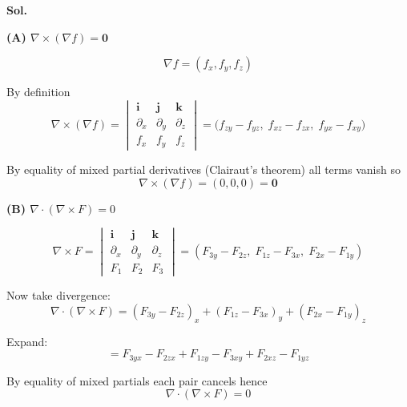 \documentclass[14pt]{extarticle}
\begin{document}
\begin{enumerate}
\textbf{Sol.}

\noindent\textbf{(A) $\nabla\times(\nabla f)=\mathbf{0}$}

\[
\nabla f = (f_x,f_y,f_z)
\]

By definition
\[
\nabla\times(\nabla f)
= \begin{vmatrix}
\mathbf{i} & \mathbf{j} & \mathbf{k} \\
\partial_x & \partial_y & \partial_z \\
f_x & f_y & f_z
\end{vmatrix}
= \bigl(f_{z y}-f_{y z},\; f_{x z}-f_{z x},\; f_{y x}-f_{x y}\bigr)
\]

By equality of mixed partial derivatives (Clairaut's theorem) all terms vanish so
\[
\nabla\times(\nabla f) = (0,0,0) = \mathbf{0}
\]

\medskip

\noindent\textbf{(B) $\nabla\cdot(\nabla\times F)=0$}

\[
\nabla\times F =
\begin{vmatrix}
\mathbf{i} & \mathbf{j} & \mathbf{k}\\
\partial_x & \partial_y & \partial_z\\
F_1 & F_2 & F_3
\end{vmatrix}
= (F_{3y}-F_{2z},\; F_{1z}-F_{3x},\; F_{2x}-F_{1y})
\]

Now take divergence:
\[
\nabla\cdot(\nabla\times F) = (F_{3y}-F_{2z})_x + (F_{1z}-F_{3x})_y + (F_{2x}-F_{1y})_z
\]

Expand:
\[
= F_{3yx} - F_{2zx} + F_{1zy} - F_{3xy} + F_{2xz} - F_{1yz}
\]

By equality of mixed partials each pair cancels hence
\[
\nabla\cdot(\nabla\times F)=0
\]

\end{enumerate}
\end{document}
